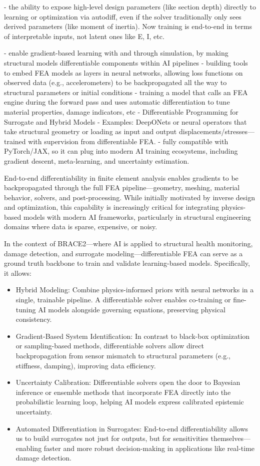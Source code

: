 
- the ability to expose high-level design parameters (like section depth) directly to learning or optimization via autodiff, even if the solver traditionally only sees derived parameters (like moment of inertia). Now training is end-to-end in terms of interpretable inputs, not latent ones like E, I, etc.

- enable gradient-based learning with and through simulation, by making structural models differentiable components within AI pipelines
- building tools to embed FEA models as layers in neural networks, allowing loss functions on observed data (e.g., accelerometers) to be backpropagated all the way to structural parameters or initial conditions
- training a model that calls an FEA engine during the forward pass and uses automatic differentiation to tune material properties, damage indicators, etc
- Differentiable Programming for Surrogate and Hybrid Models
- Examples: DeepONets or neural operators that take structural geometry or loading as input and output displacements/stresses—trained with supervision from differentiable FEA.
- fully compatible with PyTorch/JAX, so it can plug into modern AI training ecosystems, including gradient descent, meta-learning, and uncertainty estimation.

End-to-end differentiability in finite element analysis enables gradients to be backpropagated through the full FEA pipeline—geometry, meshing, material behavior, solvers, and post-processing. 
While initially motivated by inverse design and optimization, this capability is increasingly critical for integrating physics-based models with modern AI frameworks, particularly in structural engineering domains where data is sparse, expensive, or noisy.

In the context of BRACE2—where AI is applied to structural health monitoring, damage detection, and surrogate modeling—differentiable FEA can serve as a ground truth backbone to train and validate learning-based models. Specifically, it allows:
\begin{itemize}
    \item 
Hybrid Modeling: Combine physics-informed priors with neural networks in a single, trainable pipeline. A differentiable solver enables co-training or fine-tuning AI models alongside governing equations, preserving physical consistency.
\item
Gradient-Based System Identification: In contrast to black-box optimization or sampling-based methods, differentiable solvers allow direct backpropagation from sensor mismatch to structural parameters (e.g., stiffness, damping), improving data efficiency.
\item
Uncertainty Calibration: Differentiable solvers open the door to Bayesian inference or ensemble methods that incorporate FEA directly into the probabilistic learning loop, helping AI models express calibrated epistemic uncertainty.
\item
Automated Differentiation in Surrogates: End-to-end differentiability allows us to build surrogates not just for outputs, but for sensitivities themselves—enabling faster and more robust decision-making in applications like real-time damage detection.
\end{itemize}

